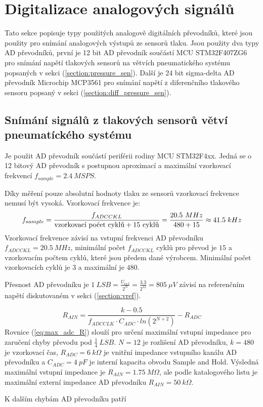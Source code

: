 \section{Digitalizace analogových signálů}
Tato sekce popisuje typy použitých analogově digitálních převodníků, které jsou použity pro snímání analogových výstupů ze sensorů tlaku. Jsou použity dva typy AD převodníků, první je 12 bit AD převodník součástí MCU STM32F407ZG6 pro snímání napětí tlakových sensorů na větvích pneumatického systému popsaných v sekci (\ref{section:pressure_sen}).
Další je 24 bit sigma-delta AD převodník Microchip MCP3561 pro snímání napětí z diferenčního tlakového sensoru popsaný v sekci (\ref{section:diff_pressure_sen}).

\subsection{Snímání signálů z tlakových sensorů větví pneumatíckého systému}
Je použit AD převodník součástí periférii rodiny MCU STM32F4xx. Jedná se o 12 bitový AD převodník s postupnou aproximací a maximální vzorkovací frekvencí $f_{sample} = 2.4 \ MSPS$. \par
Díky měření pouze absolutní hodnoty tlaku ze sensorů vzorkovací frekvence nemusí být vysoká. Vzorkovací frekvence je:
\begin{equation}
    f_{sample}=\frac{f_{ADCCKL}}{\textnormal{vzorkovací počet cyklů} + 15 \ \textnormal{cyklů} } = \frac{20.5 \ MHz}{480 + 15} \approx 41.5 \; kHz
\end{equation}
Vzorkovací frekvence závisí na vstupní frekvenci AD převodníku $f_{ADCCKL} = 20.5 \ MHz$, minimální počet $f_{ADCCKL} $ cyklů pro převod je $15$ a vzorkovacím počtem cyklů, které jsou předem dané výrobcem. Minimální počet vzorkovacích cyklů je $3$ a maximální je $480$.
\par
Přesnost AD převodníku je $1 \ LSB = \frac{U_{ref}}{2^N} = \frac{3.3}{2^{12}} = 805 \ \mu V$ závisí na referenčním napětí diskutovaném v sekci (\ref{section:vref}).

\begin{equation} \label{eq:max_adc_R}
    R_{AIN} = \frac{k - 0.5}{f_{ADCCLK} \cdot C_{ADC} \cdot ln(2^{N+2})} - R_{ADC}
\end{equation}
Rovnice (\ref{eq:max_adc_R}) slouží pro určení maximální vstupní impedance pro zaručení chyby převodu pod $\frac{1}{4} \ LSB$. $N = 12$ je rozlišení AD převodníku, $k = 480$ je vzorkovací čas, $R_{ADC} = 6 \ k\Omega$ je vnitřní impedance vstupního kanálu AD převodníku a
$C_{ADC} = 4 \ pF$ je interní kapacita obvodu Sample and Hold. Výsledná maximální vstupní impedance je $R_{AIN} = 1.75 \ M\Omega$, ale podle katalogového listu je maximální externí impedance AD převodníku $R_{AIN} = 50 \ k\Omega$.
\par
K dalším chybám AD převodníku patří

